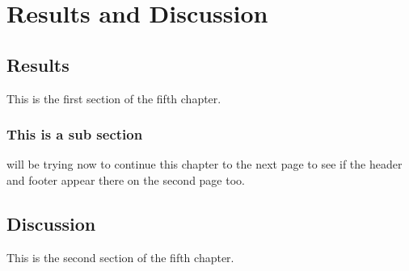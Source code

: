 \chapter{Results and Discussion} \label{Results}
\section{Results} \label{Results}
This is the first section of the fifth chapter.

\subsection{This is a sub section} \label{This is a sub section}
will be trying now to continue this chapter to the next page to see if the header and footer appear there on the second page too.
\section{Discussion} \label{Discussion}
This is the second section of the fifth chapter.

